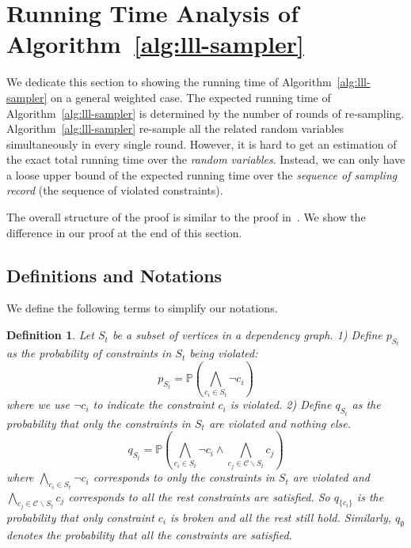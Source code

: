 \documentclass[letterpaper]{article} %
\newtheorem{definition}{Definition}
\newcommand{\p}{\mathbb{P}}
\begin{document}
\section{Running Time Analysis of Algorithm~\ref{alg:lll-sampler}} \label{appendix:time-analysis}
We dedicate this section to showing the running time of Algorithm~\ref{alg:lll-sampler} on a general weighted case.
%
The expected running time of Algorithm~\ref{alg:lll-sampler} is determined by the number of rounds of re-sampling.  
%
Algorithm~\ref{alg:lll-sampler} re-sample all the related random variables simultaneously in every single round.
%
However, it is hard to get an estimation of the exact total running time over the \textit{random variables}. Instead, we can only have a loose upper bound of the expected running time over the \textit{sequence of sampling record} (the sequence of violated constraints).

The overall structure of the proof is similar to the proof in~\citet[Theorem 13]{DBLP:journals/jacm/GuoJL19}. We show the difference in our proof at the end of this section.

\subsection{Definitions and Notations}
We define the following terms to simplify our notations.
\begin{definition}  \label{def:p_q_st}
Let $S_t$ be a subset of vertices in a dependency graph.
1) Define $p_{S_t}$ as the probability of  constraints in $S_t$ being violated:
\begin{equation} \label{eq:def-pst}
p_{S_t}=\p\left(\bigwedge_{c_i \in S_t}\neg{c}_i \right)
\end{equation}
{where we use $\neg{c}_i $ to indicate the constraint $c_i$ is violated.}
2) Define $q_{S_t}$ as the probability that only the constraints in $S_t$ are violated and nothing else. 
\begin{equation} \label{eq:definition-qst}
q_{S_t}=\p\left(\bigwedge_{c_i \in S_t}\neg{c}_i \wedge \bigwedge_{c_j \in \mathcal{C}\backslash S_t}c_j\right)
\end{equation}
{where $\bigwedge_{c_i \in S_t}\neg{c}_i $ corresponds to only the constraints in $S_t$ are violated and $\bigwedge_{c_j \in \mathcal{C}\backslash S_t}c_j$ corresponds to all the rest constraints are satisfied.}
So $q_{\{c_i\}}$ is the probability that only constraint $c_i$ is broken and all the rest still  hold. Similarly, $q_{\emptyset}$ denotes the probability that all the constraints are satisfied.
\end{definition}
\end{document}

